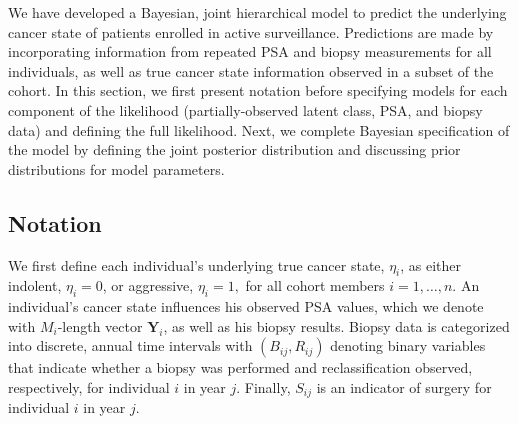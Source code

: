 \documentclass[12pt, letterpaper]{article}
\newcommand{\bmY}{\mathbf{Y}}
\begin{document}
We have developed a Bayesian, joint hierarchical model to predict the underlying cancer state of patients enrolled in active surveillance. Predictions are made by incorporating information from repeated PSA and biopsy measurements for all individuals, as well as true cancer state information observed in a subset of the cohort. In this section, we first present notation before specifying models for each component of the likelihood (partially-observed latent class, PSA, and biopsy data) and defining the full likelihood. Next, we complete Bayesian specification of the model by defining the joint posterior distribution and discussing prior distributions for model parameters.  

\subsection{Notation} 
We first define each individual's underlying true cancer state, $\eta_i$, as either indolent, $\eta_i=0$, or aggressive, $\eta_i=1,$ for all cohort members $i=1,\dots,n$.  An individual's cancer state influences his observed PSA values, which we denote with $M_i$-length vector $\bmY_i$, as well as his biopsy results. Biopsy data is categorized into discrete, annual time intervals with $(B_{ij}, R_{ij})$ denoting binary variables that indicate whether a biopsy was performed and reclassification observed, respectively, for individual $i$ in year $j$.  Finally, $S_{ij}$ is an indicator of surgery for individual $i$ in year $j$. 
\end{document}
